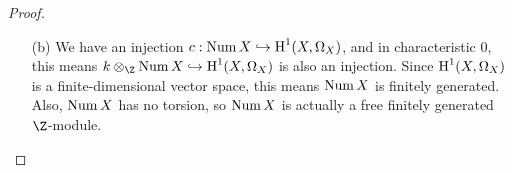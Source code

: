 \documentclass[a4paper]{article}
\begin{document}
\begin{enumerate} [label=\textbf{\arabic*.}, leftmargin=0em]
\begin{proof}
\begin{itemize} [leftmargin=0cm]
                        Generalizing, we want to show the following diagram commutes
                        \[ \begin{tikzcd}
                                {\pic(X)} \arrow[d, "c"'] \arrow[r, "(D.\cdot) \cdot 1"] & \Z \arrow[d] \\
                                {\cH^1(X, \Omega_X)} \arrow[r, "\theta_D"]     & k
                            \end{tikzcd}. \]
                        The top row factos into
                        \[ \begin{tikzcd}
                                & {\pic{D}} \arrow[d, "\deg"] \\
                                {\pic{X}} \arrow[r, "(D.\cdot) \cdot 1"] \arrow[ru] & \Z
                            \end{tikzcd}. \]
                        The bottom row factors into
                        \[ \begin{tikzcd}
                                & {\cH^1(D, \Omega_D)} \arrow[d, "t_D"] \\
                                {\cH^1(X, \Omega_X)} \arrow[r, "\theta_D"] \arrow[ru] & k
                            \end{tikzcd}. \]
                        The left column factors into
                        \[ \begin{tikzcd}
                                {\pic{X}} \arrow[r] \arrow[d, "c"] & {\pic{D}} \arrow[d, "c"] \\
                                {\cH^1(X, \Omega_X)} \arrow[r]     & {\cH^1(D, \Omega_D)}
                            \end{tikzcd}. \]
                        The result of (III, Ex. 7.4) gives the commutative diagram
                        \[ \begin{tikzcd}
                                {\pic{D}} \arrow[r, "\deg"] \arrow[d, "c"']    & \Z \arrow[d] \\
                                {\cH^1(D, \Omega_D)} \arrow[r, "t_D"] & k
                            \end{tikzcd}. \]
                        So the original diagram commutes.

                  \item[(b)] We have an injection $c : \operatorname{Num}{X} \hookrightarrow \operatorname{H}^1(X, \Omega_X)$, and in characteristic 0, this means $k \otimes_\Z \Num{X} \hookrightarrow \cH^1(X, \Omega_X)$ is also an injection.
                        Since $\operatorname{H}^1(X, \Omega_X)$ is a finite-dimensional vector space, this means $\operatorname{Num}{X}$ is finitely generated.
                        Also, $\operatorname{Num}{X}$ has no torsion, so $\operatorname{Num}{X}$ is actually a free finitely generated $\Z$-module.
              \end{itemize}
          \end{proof}


\end{enumerate}
\end{document}
